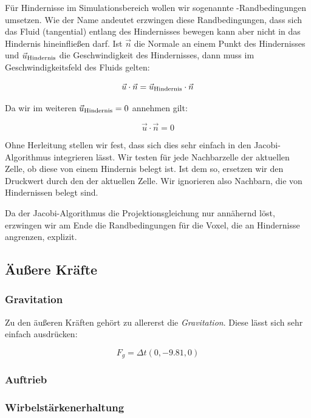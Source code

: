 Für Hindernisse im Simulationsbereich wollen wir sogenannte
-Randbedingungen umsetzen. Wie der Name andeutet
erzwingen diese Randbedingungen, dass sich das Fluid (tangential) entlang des
Hindernisses bewegen kann aber nicht in das Hindernis hineinfließen darf.
Ist $\vec{n}$ die Normale an einem Punkt des Hindernisses und
$\vec{u}_{\textrm{Hindernis}}$ die Geschwindigkeit des Hindernisses,
dann muss im Geschwindigkeitsfeld des Fluids gelten:

\begin{equation}
\vec{u} \cdot \vec{n} = \vec{u}_{\textrm{Hindernis}} \cdot \vec{n}
\end{equation}

Da wir im weiteren $\vec{u}_{\textrm{Hindernis}}=0$ annehmen gilt:

\begin{equation}
\vec{u} \cdot \vec{n} = 0
\end{equation}

Ohne Herleitung stellen wir fest, dass sich dies sehr einfach in den
Jacobi-Algorithmus integrieren lässt. Wir testen für jede Nachbarzelle der
aktuellen Zelle, ob diese von einem Hindernis belegt ist. Ist dem so, ersetzen
wir den Druckwert durch den der aktuellen Zelle. Wir ignorieren also Nachbarn,
die von Hindernissen belegt sind.

Da der Jacobi-Algorithmus die Projektionsgleichung nur annähernd löst,
erzwingen wir am Ende die Randbedingungen für die Voxel, die an Hindernisse
angrenzen, explizit.

\subsection{Äußere Kräfte}

\subsubsection{Gravitation}

Zu den äußeren Kräften gehört zu allererst die \emph{Gravitation}. Diese lässt
sich sehr einfach ausdrücken:

\begin{equation}
F_g = \Delta t (0,-9.81,0)
\end{equation}

\subsubsection{Auftrieb}


\subsubsection{Wirbelstärkenerhaltung}

